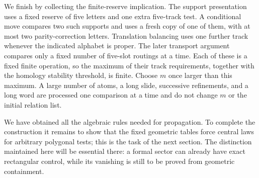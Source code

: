 We finish by collecting the finite-reserve implication.
The support presentation uses a fixed reserve of five
letters and one extra five-track test.  A conditional
move compares two such supports and uses a fresh copy
of one of them, with at most two parity-correction
letters.  Translation balancing uses one further
track whenever the indicated alphabet is proper.
The later transport argument compares only a fixed
number of five-slot routings at a time.  Each of these
is a fixed finite operation, so the maximum of their
track requirements, together with the homology
stability threshold, is finite.  Choose $m$ once
larger than this maximum.  A large number of atoms,
a long slide, successive refinements, and a long
word are processed one comparison at a time and do
not change $m$ or the initial relation list.

We have obtained all the algebraic rules needed for
propagation.  To complete the construction it remains
to show that the fixed geometric tables force central
laws for arbitrary polygonal tests; this is the task
of the next section.  The distinction maintained
here will be essential there: a formal sector can
already have exact rectangular control, while its
vanishing is still to be proved from geometric
containment.
